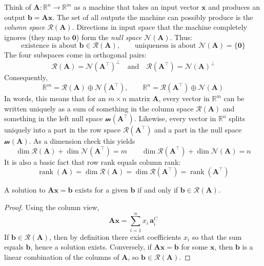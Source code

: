 Think of $\mathbf{A}:\mathbb{R}^n\to\mathbb{R}^m$ as a machine that takes an input vector $\mathbf{x}$ and produces an output $\mathbf{b}=\mathbf{A}\mathbf{x}$. The set of all outputs the machine can possibly produce is the \emph{column space} $\mathcal{R}(\mathbf{A})$. Directions in input space that the machine completely ignores (they map to $\mathbf{0}$) form the \emph{null space} $\mathcal{N}(\mathbf{A})$. Thus:
\[
\text{existence is about }\mathbf{b}\in\mathcal{R}(\mathbf{A}),\qquad
\text{uniqueness is about }\mathcal{N}(\mathbf{A})=\{\mathbf{0}\}
\]
The four subspaces come in orthogonal pairs:
\[
\mathcal{R}(\mathbf{A})=\mathcal{N}(\mathbf{A}^{\top})^{\perp}
\quad\text{and}\quad
\mathcal{R}(\mathbf{A}^{\top})=\mathcal{N}(\mathbf{A})^{\perp}
\]
Consequently,
\[
\mathbb{R}^m=\mathcal{R}(\mathbf{A})\oplus \mathcal{N}(\mathbf{A}^{\top}),
\qquad
\mathbb{R}^n=\mathcal{R}(\mathbf{A}^{\top})\oplus \mathcal{N}(\mathbf{A})
\]
In words, this means that for an $m\times n$ matrix $\mathbf{A}$, every vector in $\mathbb{R}^m$ can be written uniquely as a sum of something in the column space $\mathcal R(\mathbf{A})$ and something in the left null space $\mathcal m(\mathbf{A}^\top)$. Likewise, every vector in $\mathbb{R}^n$ splits uniquely into a part in the row space $\mathcal R(\mathbf{A}^\top)$ and a part in the null space $\mathcal m(\mathbf{A})$. As a dimension check this yields
\[
\dim\mathcal{R}(\mathbf{A})+\dim\mathcal{N}(\mathbf{A}^{\top})=m
\qquad
\dim\mathcal{R}(\mathbf{A}^{\top})+\dim\mathcal{N}(\mathbf{A})=n
\]
It is also a basic fact that row rank equals column rank:
\[
\operatorname{rank}(\mathbf{A})=\dim\mathcal{R}(\mathbf{A})
=\dim\mathcal{R}(\mathbf{A}^{\top})
=\operatorname{rank}(\mathbf{A}^{\top})
\]

\begin{theoremBox}
\begin{theorem}
A solution to $\mathbf{A}\mathbf{x}=\mathbf{b}$ exists for a given $\mathbf{b}$ if and only if $\mathbf{b}\in\mathcal{R}(\mathbf{A})$.
\end{theorem}
\begin{proof}
Using the column view,
\[
\mathbf{A}\mathbf{x}=\sum_{i=1}^{n}x_i\,\mathbf{a}^C_i
\]
If $\mathbf{b}\in\mathcal{R}(\mathbf{A})$, then by definition there exist coefficients $x_i$ so that the sum equals $\mathbf{b}$, hence a solution exists. Conversely, if $\mathbf{A}\mathbf{x}=\mathbf{b}$ for some $\mathbf{x}$, then $\mathbf{b}$ is a linear combination of the columns of $\mathbf{A}$, so $\mathbf{b}\in\mathcal{R}(\mathbf{A})$.
\end{proof}

\end{theoremBox}


